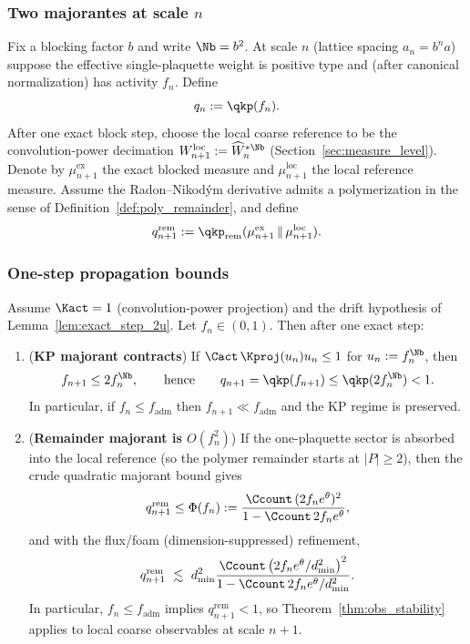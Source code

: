 \subsubsection{Two majorantes at scale \texorpdfstring{$n$}{n}}

Fix a blocking factor $b$ and write $\Nb=b^2$.
At scale $n$ (lattice spacing $a_n=b^n a$) suppose the effective single-plaquette weight is positive type and (after canonical normalization) has activity $f_n$.
Define
\[
q_n:=\qkp(f_n).
\]
After one exact block step, choose the local coarse reference to be the convolution-power decimation $W_{n+1}^{\mathrm{loc}}:=\widehat W_n^{*\Nb}$ (Section~\ref{sec:measure_level}).
Denote by $\mu^{\mathrm{ex}}_{n+1}$ the exact blocked measure and $\mu^{\mathrm{loc}}_{n+1}$ the local reference measure.
Assume the Radon--Nikod\'ym derivative admits a polymerization in the sense of Definition~\ref{def:poly_remainder}, and define
\[
q^{\mathrm{rem}}_{n+1}:=\qkp_{\mathrm{rem}}(\mu^{\mathrm{ex}}_{n+1}\,\|\,\mu^{\mathrm{loc}}_{n+1}).
\]

\subsubsection{One-step propagation bounds}

\begin{proposition}\label{prop:two_majorant_step}
Assume $\Kact=1$ (convolution-power projection) and the drift hypothesis of Lemma~\ref{lem:exact_step_2u}.
Let $f_n\in(0,1)$.
Then after one exact step:
\begin{enumerate}[leftmargin=*]
\item (\textbf{KP majorant contracts}) If $\Cact\,\Kproj(u_n)u_n\le 1$ for $u_n:=f_n^{\Nb}$, then
\begin{equation}\label{eq:fnplus1_bound}
f_{n+1}\le 2 f_n^{\Nb},
\qquad\text{hence}\qquad
q_{n+1}=\qkp(f_{n+1})\le \qkp(2 f_n^{\Nb})<1.
\end{equation}
In particular, if $f_n\le f_{\mathrm{adm}}$ then $f_{n+1}\ll f_{\mathrm{adm}}$ and the KP regime is preserved.

\item (\textbf{Remainder majorant is $O(f_n^2)$}) If the one-plaquette sector is absorbed into the local reference (so the polymer remainder starts at $|P|\ge 2$), then the crude quadratic majorant bound gives
\begin{equation}\label{eq:qrem_step_bound}
q^{\mathrm{rem}}_{n+1}\le
\Phi(f_n)
:=\frac{\Ccount\,(2 f_n e^{\theta})^{2}}{1-\Ccount\,2 f_n e^{\theta}},
\end{equation}
and with the flux/foam (dimension-suppressed) refinement,
\begin{equation}\label{eq:qrem_step_bound_dim}
q^{\mathrm{rem}}_{n+1}\ \lesssim\
d_{\min}^{2}
\frac{\Ccount\,\bigl(2 f_n e^{\theta}/d_{\min}^{2}\bigr)^{2}}{1-\Ccount\,2 f_n e^{\theta}/d_{\min}^{2}}.
\end{equation}
In particular, $f_n\le f_{\mathrm{adm}}$ implies $q^{\mathrm{rem}}_{n+1}<1$, so Theorem~\ref{thm:obs_stability} applies to local coarse observables at scale $n+1$.
\end{enumerate}
\end{proposition}

